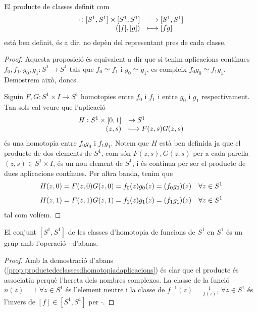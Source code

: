 \documentclass[../main.tex]{subfiles}
\begin{document}
\begin{prop}
\label{prop:productedeclassesdhomotopiadaplicacions} El producte de classes definit com
\begin{equation}
    \notag
    \begin{array}{rl}
        \cdotp:[S^1,S^1]\times [S^1,S^1] & \longrightarrow [S^1,S^1] \\
        ([f],[g]) & \longmapsto [fg]
    \end{array}
\end{equation}
està ben definit, és a dir, no depèn del representant pres de cada classe.
\end{prop}
\begin{proof}
Aquesta proposició és equivalent a dir que si tenim aplicacions contínues $f_0,f_1,g_0,g_1:S^1\rightarrow S^1$ tals que $f_0\simeq f_1$ i $g_0\simeq g_1$, es compleix $f_0 g_0\simeq f_1 g_1$. Demostrem això, doncs.

Siguin $F,G:S^1\times I\rightarrow S^1$ homotopies entre $f_0$ i $f_1$ i entre $g_0$ i $g_1$ respectivament. Tan sols cal veure que l'aplicació 
\begin{equation}
    \notag
    \begin{array}{rl}
        H:S^1\times[0,1] & \rightarrow S^1 \\
        (z,s) & \longmapsto F(z,s)G(z,s)
    \end{array}
\end{equation}
és una homotopia entre $f_0g_0$ i $f_1g_1$. Notem que $H$ està ben definida ja que el producte de dos elements de $S^1$, com són $F(z,s),G(z,s)$ per a cada parella $(z,s)\in S^1\times I$, és un nou element de $S^1$, i és contínua per ser el producte de dues aplicacions contínues. Per altra banda, tenim que
\begin{equation}
    \notag
    H(z,0) = F(z,0)G(z,0) = f_0(z)g_0(z) = (f_0g_0)(z)\quad\forall z\in S^1
\end{equation}
\begin{equation}
    \notag
    H(z,1) = F(z,1)G(z,1) = f_1(z)g_1(z) = (f_1g_1)(z)\quad \forall z\in S^1
\end{equation}
tal com volíem.
\end{proof}

\begin{prop}
\label{prop:grupequivalenciahomotopica} El conjunt $[S^1,S^1]$ de les classes d'homotopia de funcions de $S^1$ en $S^1$ és un grup amb l'operació $\cdotp$ d'abans. 
\end{prop}
\begin{proof}
Amb la demostració d'abans (\ref{prop:productedeclassesdhomotopiadaplicacions}) és clar que el producte és associatiu perquè l'hereta dels nombres complexos. La classe de la funció $n(z)  = 1$ $\forall z\in S^1$ és l'element neutre i la classe de $f^{-1}(z) = \frac{1}{f(z)}$, $\forall z\in S^1$ és l'invers de $[f]\in [S^1,S^1]$ per $\cdotp$.
\end{proof}
\end{document}
